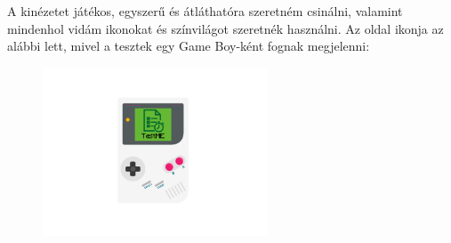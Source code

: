 










A kinézetet játékos, egyszerű és átláthatóra szeretném csinálni, valamint mindenhol vidám ikonokat és színvilágot szeretnék használni. Az oldal ikonja az alábbi lett, mivel a tesztek egy Game Boy-ként fognak megjelenni:

\begin{figure}[h]
    \centering
    \includegraphics[height=5cm]{images/gameboy.png}
\end{figure}


